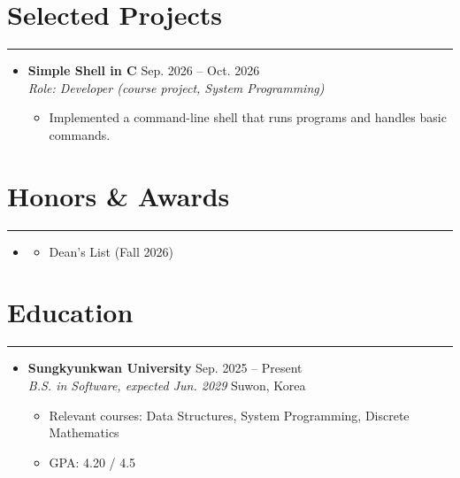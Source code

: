 \documentclass[letterpaper, 10pt]{article}
\begin{document}
\section*{Selected Projects}
\hrule
\vspace{4pt}
\begin{itemize}
\item[]
\textbf{Simple Shell in C} \hfill Sep. 2026 -- Oct. 2026 \\
\textit{Role: Developer (course project, System Programming)}
\begin{itemize}
    \item Implemented a command-line shell that runs programs and handles basic commands.
\end{itemize}
\end{itemize}
\section*{Honors \& Awards}
\hrule
\vspace{4pt}
\begin{itemize}
\item[]
\begin{itemize}
    \item Dean's List (Fall 2026)
\end{itemize}
\end{itemize}
\section*{Education}
\hrule
\vspace{4pt}
\begin{itemize}
\item[]
\textbf{Sungkyunkwan University} \hfill Sep. 2025 -- Present \\ 
\textit{B.S. in Software, expected Jun. 2029} \hfill Suwon, Korea
\begin{itemize}
    \item Relevant courses: Data Structures, System Programming, Discrete Mathematics
    \item GPA: 4.20 / 4.5
\end{itemize}
\end{itemize}
\end{document}
